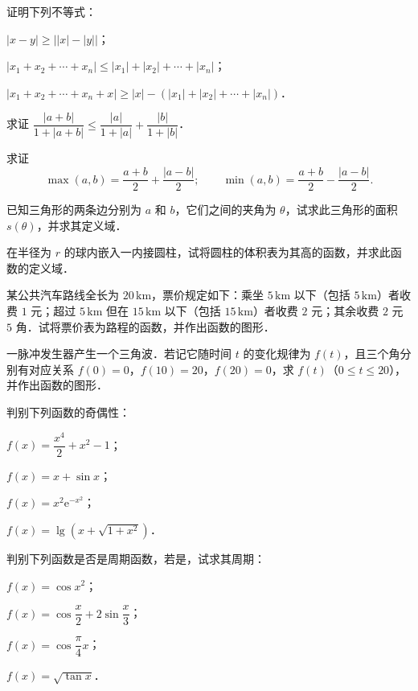 \begin{xiti}
\item 证明下列不等式：
  \begin{ziti}
  \item $|x-y|\geqslant\bigl||x|-|y|\bigr|$；
  \item $|x_1+x_2+\cdots+x_n|\leqslant|x_1|+|x_2|+\cdots+|x_n|$；
  \item $|x_1+x_2+\cdots+x_n+x|\geqslant|x|-(|x_1|+|x_2|+\cdots+|x_n|)$．
  \end{ziti}
\item 求证 $\dfrac{|a+b|}{1+|a+b|}\leqslant\dfrac{|a|}{1+|a|}+\dfrac{|b|}{1+|b|}$．
\item 求证
\[
\max(a,b)=\frac{a+b}{2}+\frac{|a-b|}{2};\qquad \min(a,b)=\frac{a+b}{2}-\frac{|a-b|}{2}.
\]
\item 已知三角形的两条边分别为 $a$ 和 $b$，它们之间的夹角为 $\theta$，试求此三角形的面积 $s(\theta)$，并求其定义域．
\item 在半径为 $r$ 的球内嵌入一内接圆柱，试将圆柱的体积表为其高的函数，并求此函数的定义域．
\item 某公共汽车路线全长为 $20\,\mathrm{km}$，票价规定如下：乘坐 $5\,\mathrm{km}$ 以下（包括 $5\,\mathrm{km}$）者收费 $1$ 元；超过 $5\,\mathrm{km}$ 但在 $15\,\mathrm{km}$ 以下（包括 $15\,\mathrm{km}$）者收费 $2$ 元；其余收费 $2$ 元 $5$ 角．试将票价表为路程的函数，并作出函数的图形．
\item 一脉冲发生器产生一个三角波．若记它随时间 $t$ 的变化规律为 $f(t)$，且三个角分别有对应关系 $f(0)=0$，$f(10)=20$，$f(20)=0$，求 $f(t)$（$0\leqslant t\leqslant 20$），并作出函数的图形．
\item 判别下列函数的奇偶性：
  \begin{ziti}
  \item $f(x)=\dfrac{x^4}{2}+x^2-1$；
  \item $f(x)=x+\sin x$；
  \item $f(x)=x^2\mathrm{e}^{-x^2}$；
  \item $f(x)=\lg(x+\sqrt{1+x^2})$．
  \end{ziti}
\item 判别下列函数是否是周期函数，若是，试求其周期：
  \begin{ziti}
  \item $f(x)=\cos x^2$；
  \item $f(x)=\cos\dfrac{x}{2}+2\sin\dfrac{x}{3}$；
  \item $f(x)=\cos\dfrac{\pi}{4}x$；
  \item $f(x)=\sqrt{\tan x}$．
  \end{ziti}

\end{xiti}
